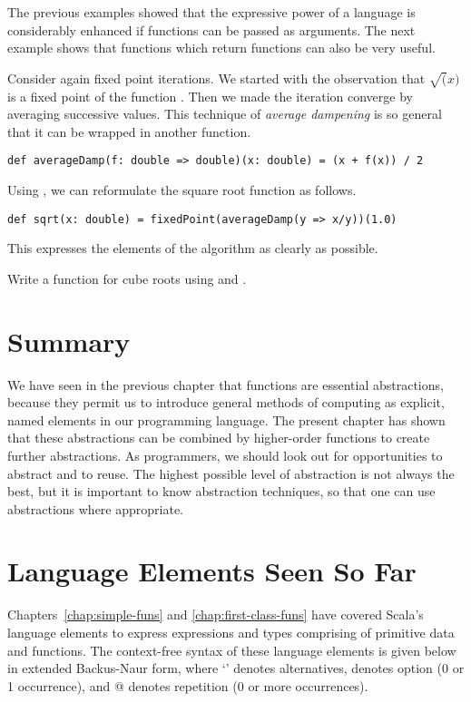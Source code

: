 The previous examples showed that the expressive power of a language
is considerably enhanced if functions can be passed as arguments.  The
next example shows that functions which return functions can also be
very useful.

Consider again fixed point iterations. We started with the observation
that $\sqrt(x)$ is a fixed point of the function .
Then we made the iteration converge by averaging successive values.
This technique of {\em average dampening} is so general that it
can be wrapped in another function.
\begin{lstlisting}
def averageDamp(f: double => double)(x: double) = (x + f(x)) / 2
\end{lstlisting}
Using , we can reformulate the square root function
as follows.
\begin{lstlisting}
def sqrt(x: double) = fixedPoint(averageDamp(y => x/y))(1.0)
\end{lstlisting}
This expresses the elements of the algorithm as clearly as possible.

\begin{exercise} Write a function for cube roots using  and 
.
\end{exercise}

\section{Summary}

We have seen in the previous chapter that functions are essential
abstractions, because they permit us to introduce general methods of
computing as explicit, named elements in our programming language.
The present chapter has shown that these abstractions can be combined
by higher-order functions to create further abstractions.  As
programmers, we should look out for opportunities to abstract and to
reuse. The highest possible level of abstraction is not always the
best, but it is important to know abstraction techniques, so that one
can use abstractions where appropriate.

\section{Language Elements Seen So Far}

Chapters~\ref{chap:simple-funs} and \ref{chap:first-class-funs} have
covered Scala's language elements to express expressions and types
comprising of primitive data and functions.  The context-free syntax
of these language elements is given below in extended Backus-Naur
form, where `\code{|}' denotes alternatives, \code{[...]} denotes
option (0 or 1 occurrence), and @ denotes repetition
(0 or more occurrences).

